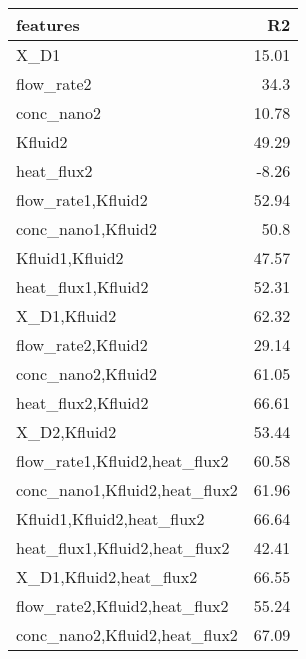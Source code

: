 
    \begin{table*}
        \centering
        \begin{tabular}{lr}
\hline
 features                                                      &    R2 \\
\hline
 X\_D1                                                         & 15.01 \\
 flow\_rate2                                                   & 34.3  \\
 conc\_nano2                                                   & 10.78 \\
 Kfluid2                                                       & 49.29 \\
 heat\_flux2                                                   & -8.26 \\
 flow\_rate1,Kfluid2                                           & 52.94 \\
 conc\_nano1,Kfluid2                                           & 50.8  \\
 Kfluid1,Kfluid2                                               & 47.57 \\
 heat\_flux1,Kfluid2                                           & 52.31 \\
 X\_D1,Kfluid2                                                 & 62.32 \\
 flow\_rate2,Kfluid2                                           & 29.14 \\
 conc\_nano2,Kfluid2                                           & 61.05 \\
 heat\_flux2,Kfluid2                                           & 66.61 \\
 X\_D2,Kfluid2                                                 & 53.44 \\
 flow\_rate1,Kfluid2,heat\_flux2                               & 60.58 \\
 conc\_nano1,Kfluid2,heat\_flux2                               & 61.96 \\
 Kfluid1,Kfluid2,heat\_flux2                                   & 66.64 \\
 heat\_flux1,Kfluid2,heat\_flux2                               & 42.41 \\
 X\_D1,Kfluid2,heat\_flux2                                     & 66.55 \\
 flow\_rate2,Kfluid2,heat\_flux2                               & 55.24 \\
 conc\_nano2,Kfluid2,heat\_flux2                               & 67.09 \\

\end{tabular}
\end{table*}
